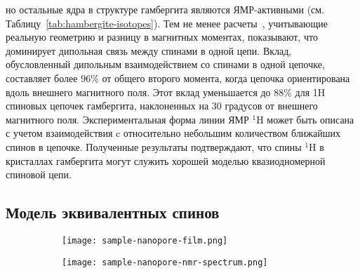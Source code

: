 но остальные ядра в структуре гамбергита являются ЯМР-активными (см. Таблицу~\ref{tab:hambergite-isotopes}).
Тем не менее расчеты~\cite{Bochkin2020jmr},
учитывающие реальную геометрию и разницу в магнитных моментах,
показывают, что доминирует дипольная связь между спинами в одной цепи.
Вклад, обусловленный дипольным взаимодействием со спинами в одной цепочке, составляет более 96\% от общего второго момента,
когда цепочка ориентирована вдоль внешнего магнитного поля.
Этот вклад уменьшается до 88\% для 1H спиновых цепочек гамбергита,
наклоненных на 30 градусов от внешнего магнитного поля.
Экспериментальная форма линии ЯМР $^1$H может быть описана
с учетом взаимодействия c относительно небольшим количеством ближайших спинов в цепочке.
Полученные результаты подтверждают,
что спины $^1$H в кристаллах гамбергита могут служить хорошей моделью квазиодномерной спиновой цепи.


\subsection{Модель эквивалентных спинов}
\label{sec:model-equivalent-spins}
\begin{figure}[H]
  \begin{subfigure}[t]{0.55\textwidth}
    \centering
    \texttt{[image: sample-nanopore-film.png]}
    \caption{\protect}
    \label{fig:sample-nanopore-film}
  \end{subfigure}
  \hfill
  \begin{subfigure}[t]{0.4\textwidth}
    \centering
    \texttt{[image: sample-nanopore-nmr-spectrum.png]}
    \caption{\protect}
    \label{fig:sample-nanopore-nmr-spectrum}
  \end{subfigure}
  \caption{}
\end{figure}


